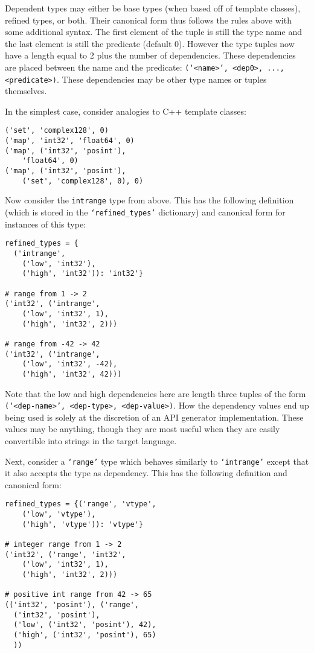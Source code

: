\documentclass{ansconfpaper}
\newcommand{\vin}[1]{\texttt{{#1}}}
\begin{document}
Dependent
types may either be base types (when based off of template classes), refined types,
or both.  Their canonical form thus follows the rules above with some additional 
syntax.  The first element of the tuple is still the type name and the last 
element is still the predicate (default 0).  However the type tuples now have a
length equal to 2 plus the number of dependencies.  These dependencies are 
placed between the name and the predicate: \vin{(`<name>', <dep0>, ..., <predicate>)}.
These dependencies may be other type names or tuples themselves. 

In the simplest case, consider analogies to C++ template classes:
\begin{lstlisting}
('set', 'complex128', 0)
('map', 'int32', 'float64', 0)
('map', ('int32', 'posint'), 
    'float64', 0)
('map', ('int32', 'posint'), 
    ('set', 'complex128', 0), 0)
\end{lstlisting}
Now consider the \vin{intrange} type from above. This has the following definition 
(which is stored in the \vin{`refined\_types'} dictionary) and canonical form for 
instances of this type:
\begin{lstlisting}
refined_types = {
  ('intrange', 
    ('low', 'int32'), 
    ('high', 'int32')): 'int32'}

# range from 1 -> 2
('int32', ('intrange', 
    ('low', 'int32', 1), 
    ('high', 'int32', 2)))

# range from -42 -> 42
('int32', ('intrange', 
    ('low', 'int32', -42), 
    ('high', 'int32', 42)))
\end{lstlisting}
Note that the low and high dependencies here are length three tuples of the form
\vin{(`<dep-name>', <dep-type>, <dep-value>)}.  How the dependency values end up 
being used is solely at the discretion of an API generator implementation.  These 
values may be anything, though they are most useful when they are easily convertible 
into strings in the target language.

Next, consider a \vin{`range'} type which behaves similarly to \vin{`intrange'} 
except that it also accepts the type as dependency.  This has the following 
definition and canonical form:
\begin{lstlisting}
refined_types = {('range', 'vtype', 
    ('low', 'vtype'), 
    ('high', 'vtype')): 'vtype'}
    
# integer range from 1 -> 2
('int32', ('range', 'int32', 
    ('low', 'int32', 1), 
    ('high', 'int32', 2)))    

# positive int range from 42 -> 65
(('int32', 'posint'), ('range', 
  ('int32', 'posint'),
  ('low', ('int32', 'posint'), 42),
  ('high', ('int32', 'posint'), 65)
  ))
\end{lstlisting}
\end{document}
